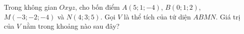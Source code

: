\begin{ex}
Trong không gian $Oxyz$, cho bốn điểm $A(5;1;-4)$, $B(0;1;2)$, $M(-3;-2;-4)$ và $N(4;3;5)$. Gọi $V$ là thể tích của tứ diện $ABMN$. Giá trị của $V$ nằm trong khoảng nào sau đây?
\end{ex}
